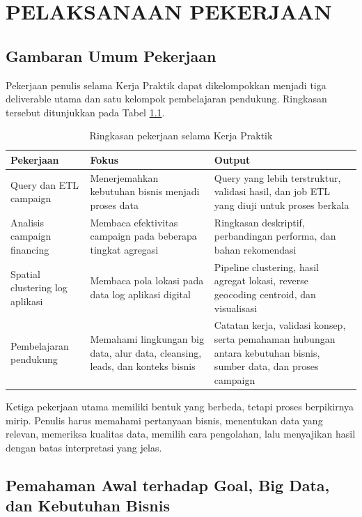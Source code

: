\cleardoublepage
\chapter{PELAKSANAAN PEKERJAAN}
\label{chap:pekerjaan}

\section{Gambaran Umum Pekerjaan}
Pekerjaan penulis selama Kerja Praktik dapat dikelompokkan menjadi tiga deliverable utama dan satu kelompok pembelajaran pendukung. Ringkasan tersebut ditunjukkan pada Tabel \ref{tab:ringkasan-pekerjaan}.

\begin{table}[htbp]
\caption{Ringkasan pekerjaan selama Kerja Praktik}
\label{tab:ringkasan-pekerjaan}
\centering
\begin{tabularx}{\textwidth}{|p{}|p{}|X|}
\hline
\textbf{Pekerjaan} & \textbf{Fokus} & \textbf{Output} \\
\hline
Query dan ETL campaign & Menerjemahkan kebutuhan bisnis menjadi proses data & Query yang lebih terstruktur, validasi hasil, dan job ETL yang diuji untuk proses berkala \\
\hline
Analisis campaign financing & Membaca efektivitas campaign pada beberapa tingkat agregasi & Ringkasan deskriptif, perbandingan performa, dan bahan rekomendasi \\
\hline
Spatial clustering log aplikasi & Membaca pola lokasi pada data log aplikasi digital & Pipeline clustering, hasil agregat lokasi, reverse geocoding centroid, dan visualisasi \\
\hline
Pembelajaran pendukung & Memahami lingkungan big data, alur data, cleansing, leads, dan konteks bisnis & Catatan kerja, validasi konsep, serta pemahaman hubungan antara kebutuhan bisnis, sumber data, dan proses campaign \\
\hline
\end{tabularx}
\end{table}

Ketiga pekerjaan utama memiliki bentuk yang berbeda, tetapi proses berpikirnya mirip. Penulis harus memahami pertanyaan bisnis, menentukan data yang relevan, memeriksa kualitas data, memilih cara pengolahan, lalu menyajikan hasil dengan batas interpretasi yang jelas.

\section{Pemahaman Awal terhadap Goal, Big Data, dan Kebutuhan Bisnis}

